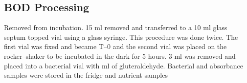 \subsection{BOD Processing}
Removed from incubation. 15 ml removed and transferred to a 10 ml glass septum topped vial using a glass syringe. This procedure was done twice. The first vial was fixed and became T--0 and the second vial was placed on the rocker--shaker to be incubated in the dark for 5 hours. 3 ml was removed and placed into a bacterial vial with ml of gluteraldehyde. Bacterial and absorbance samples were stored in the fridge and nutrient samples  